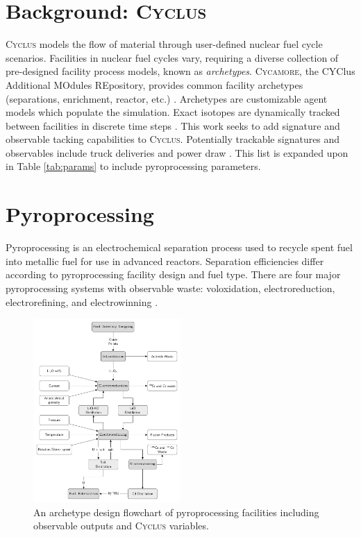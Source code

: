 \documentclass{anstrans}
\newcommand{\Cyclus}{\textsc{Cyclus}\xspace}%
\newcommand{\Cycamore}{\textsc{Cycamore}\xspace}%
\begin{document}
\section{Background: \Cyclus}
\Cyclus models the flow of material through user-defined nuclear fuel cycle scenarios. Facilities in nuclear fuel cycles vary, 
requiring a diverse collection of pre-designed facility process models, known as \emph{archetypes}. \Cycamore, the CYClus 
Additional MOdules REpository, provides common facility archetypes (separations, enrichment, reactor, etc.)
\cite{carlsen_cycamore_2014}. Archetypes are customizable agent models which populate the simulation. Exact isotopes are dynamically tracked between facilities in discrete time steps \cite{huff_fundamental_2016}. This work seeks to add signature and observable tacking capabilities to \Cyclus. Potentially trackable signatures and observables include truck deliveries and  power draw  \cite{Hou_2016,Yilmaz_2016}. This list is expanded upon in Table \ref{tab:params} to include pyroprocessing parameters.

\section{Pyroprocessing}
Pyroprocessing is an electrochemical separation process used to recycle spent fuel into metallic fuel for use in advanced reactors.
Separation efficiencies differ according to pyroprocessing facility design and fuel type. There are four major 
pyroprocessing systems with observable waste: voloxidation, electroreduction, electrorefining, and electrowinning \cite{Borrelli_2017}.  

\begin{figure}[ht] %
	\centering
	\includegraphics[width=0.5\textwidth]{flowchart}
	\caption{An archetype design flowchart of pyroprocessing facilities including observable outputs and \Cyclus variables.}
	\label{fig:flowchart}
\end{figure}
\end{document}
